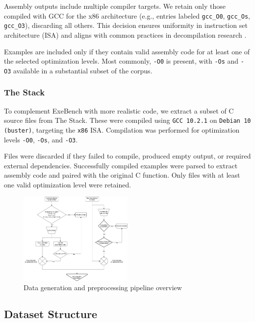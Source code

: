 \documentclass[../main.tex]{subfiles}
\begin{document}
Assembly outputs include multiple compiler targets. We retain only those compiled with GCC for the x86 architecture (e.g., entries labeled \texttt{gcc\_O0}, \texttt{gcc\_Os}, \texttt{gcc\_O3}), discarding all others. This decision ensures uniformity in instruction set architecture (ISA) and aligns with common practices in decompilation research \cite{cao_boosting_2022}.

Examples are included only if they contain valid assembly code for at least one of the selected optimization levels. Most commonly, \texttt{-O0} is present, with \texttt{-Os} and \texttt{-O3} available in a substantial subset of the corpus.

\subsubsection{The Stack}

To complement ExeBench with more realistic code, we extract a subset of C source files from The Stack. These were compiled using \texttt{GCC 10.2.1} on \texttt{Debian 10 (buster)}, targeting the \texttt{x86} ISA. Compilation was performed for optimization levels \texttt{-O0}, \texttt{-Os}, and \texttt{-O3}.

Files were discarded if they failed to compile, produced empty output, or required external dependencies. Successfully compiled examples were parsed to extract assembly code and paired with the original C function. Only files with at least one valid optimization level were retained.

\begin{figure}[htbp]
\centering
\includegraphics[width=0.5\textwidth]{images/data_gen_pipeline.png}
\caption{Data generation and preprocessing pipeline overview}
\label{fig:data_gen_pipeline}
\end{figure}

\subsection{Dataset Structure}
\end{document}
